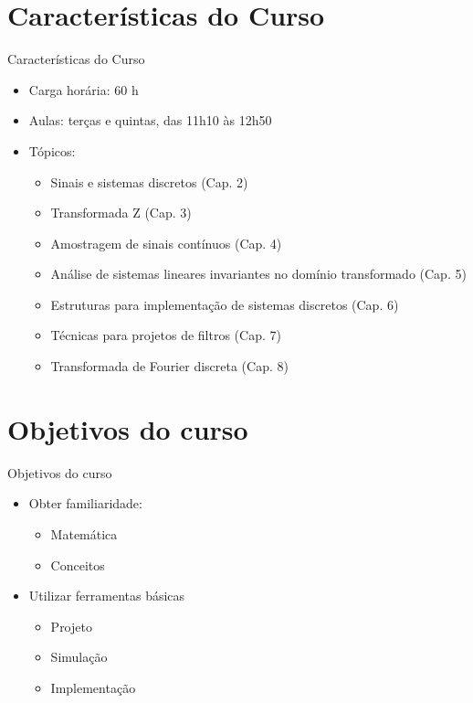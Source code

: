    \section[ slide = false ]{Características do Curso}
      \begin{slide}[toc=]{Características do Curso}
         \begin{itemize}
            \item Carga horária: 60 h
            \item Aulas: terças e quintas, das 11h10 às 12h50
            \item Tópicos:
            \begin{itemize}
               \item Sinais e sistemas discretos (Cap. 2)
               \item Transformada Z (Cap. 3)
               \item Amostragem de sinais contínuos (Cap. 4)
               \item Análise de sistemas lineares invariantes no domínio transformado (Cap. 5)
               \item Estruturas para implementação de sistemas discretos (Cap. 6)
               \item Técnicas para projetos de filtros (Cap. 7)
               \item Transformada de Fourier discreta (Cap. 8)
            \end{itemize}
         \end{itemize}         
      \end{slide}
      
   \section[slide=false]{Objetivos do curso}
      \begin{slide}[toc=]{Objetivos do curso}
         \begin{itemize}
            \item Obter familiaridade:
            \begin{itemize}
               \item Matemática
               \item Conceitos
            \end{itemize}
            \item Utilizar ferramentas básicas
            \begin{itemize}
               \item Projeto
               \item Simulação
               \item Implementação
            \end{itemize}
            
         \end{itemize}
      \end{slide}

